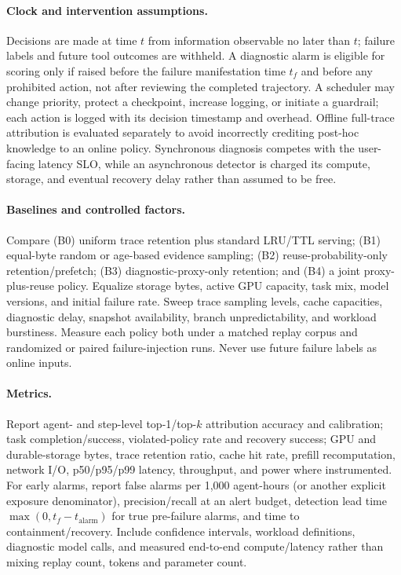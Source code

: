 \paragraph*{Clock and intervention assumptions.} Decisions are made at time $t$ from information observable no later than $t$; failure labels and future tool outcomes are withheld. A diagnostic alarm is eligible for scoring only if raised before the failure manifestation time $t_f$ and before any prohibited action, not after reviewing the completed trajectory. A scheduler may change priority, protect a checkpoint, increase logging, or initiate a guardrail; each action is logged with its decision timestamp and overhead. Offline full-trace attribution is evaluated separately to avoid incorrectly crediting post-hoc knowledge to an online policy. Synchronous diagnosis competes with the user-facing latency SLO, while an asynchronous detector is charged its compute, storage, and eventual recovery delay rather than assumed to be free.

\paragraph*{Baselines and controlled factors.} Compare (B0) uniform trace retention plus standard LRU/TTL serving; (B1) equal-byte random or age-based evidence sampling; (B2) reuse-probability-only retention/prefetch; (B3) diagnostic-proxy-only retention; and (B4) a joint proxy-plus-reuse policy. Equalize storage bytes, active GPU capacity, task mix, model versions, and initial failure rate. Sweep trace sampling levels, cache capacities, diagnostic delay, snapshot availability, branch unpredictability, and workload burstiness. Measure each policy both under a matched replay corpus and randomized or paired failure-injection runs. Never use future failure labels as online inputs.

\paragraph*{Metrics.} Report agent- and step-level top-1/top-$k$ attribution accuracy and calibration; task completion/success, violated-policy rate and recovery success; GPU and durable-storage bytes, trace retention ratio, cache hit rate, prefill recomputation, network I/O, p50/p95/p99 latency, throughput, and power where instrumented. For early alarms, report false alarms per 1,000 agent-hours (or another explicit exposure denominator), precision/recall at an alert budget, detection lead time $\max(0,t_f-t_{\mathrm{alarm}})$ for true pre-failure alarms, and time to containment/recovery. Include confidence intervals, workload definitions, diagnostic model calls, and measured end-to-end compute/latency rather than mixing replay count, tokens and parameter count.

